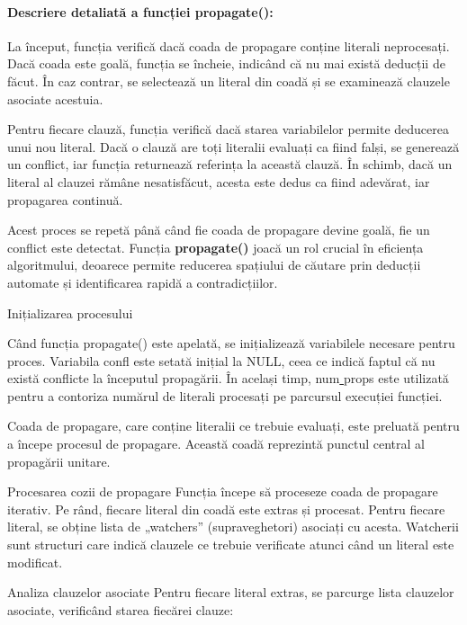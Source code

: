 \documentclass[runningheads]{llncs}
\begin{document}
\paragraph{Descriere detaliată a funcției propagate():}  
La început, funcția verifică dacă coada de propagare conține literali neprocesați. Dacă coada este goală, funcția se încheie, indicând că nu mai există deducții de făcut. În caz contrar, se selectează un literal din coadă și se examinează clauzele asociate acestuia.  

Pentru fiecare clauză, funcția verifică dacă starea variabilelor permite deducerea unui nou literal. Dacă o clauză are toți literalii evaluați ca fiind falși, se generează un conflict, iar funcția returnează referința la această clauză. În schimb, dacă un literal al clauzei rămâne nesatisfăcut, acesta este dedus ca fiind adevărat, iar propagarea continuă.  

Acest proces se repetă până când fie coada de propagare devine goală, fie un conflict este detectat. Funcția \textbf{propagate()} joacă un rol crucial în eficiența algoritmului, deoarece permite reducerea spațiului de căutare prin deducții automate și identificarea rapidă a contradicțiilor.

Inițializarea procesului

Când funcția propagate() este apelată, se inițializează variabilele necesare pentru proces. Variabila confl este setată inițial la NULL, ceea ce indică faptul că nu există conflicte la începutul propagării. În același timp, num\underline{ }props este utilizată pentru a contoriza numărul de literali procesați pe parcursul execuției funcției.

Coada de propagare, care conține literalii ce trebuie evaluați, este preluată pentru a începe procesul de propagare. Această coadă reprezintă punctul central al propagării unitare.

Procesarea cozii de propagare
Funcția începe să proceseze coada de propagare iterativ. Pe rând, fiecare literal din coadă este extras și procesat. Pentru fiecare literal, se obține lista de „watchers” (supraveghetori) asociați cu acesta. Watcherii sunt structuri care indică clauzele ce trebuie verificate atunci când un literal este modificat.

Analiza clauzelor asociate
Pentru fiecare literal extras, se parcurge lista clauzelor asociate, verificând starea fiecărei clauze:
\end{document}
